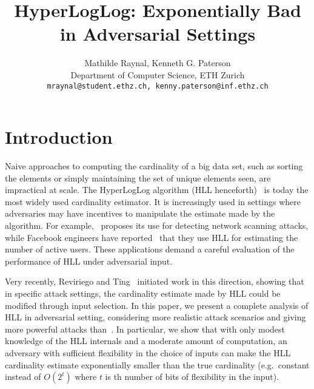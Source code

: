 \documentclass{IEEEtran}
\title{HyperLogLog: Exponentially Bad in Adversarial Settings}
\author{Mathilde Raynal, Kenneth G. Paterson\\
\vspace{3mm}
Department of Computer Science, ETH Zurich\\
{\tt mraynal@student.ethz.ch, kenny.paterson@inf.ethz.ch}}
\begin{document}
\maketitle


\IEEEdisplaynontitleabstractindextext

\section{Introduction}
Naive approaches to computing the cardinality of a big data set, such as sorting the elements or simply maintaining the set of unique elements seen, are impractical at scale. The HyperLogLog algorithm (HLL henceforth)~\cite{hll} is today the most widely used cardinality estimator. It is increasingly used in settings where adversaries may have  incentives to manipulate the estimate made by the algorithm. For example,~\cite{portscanhll} proposes its use for detecting network scanning attacks, while Facebook engineers have reported~\cite{fbhll} that they use HLL for estimating the number of active users. These applications demand a careful evaluation of the performance of HLL under adversarial input.

Very recently, Reviriego and Ting~\cite{hllvuln} initiated work in this direction, showing that in specific attack settings, the cardinality estimate made by HLL could be modified through input selection. In this paper, we present a complete analysis of HLL in adversarial setting, considering more realistic attack scenarios and giving more powerful attacks than~\cite{hllvuln}. In particular, we show that with only modest knowledge of the HLL internals and a moderate amount of computation, an adversary with sufficient flexibility in the choice of inputs can make the HLL cardinality estimate exponentially smaller than the true cardinality (e.g.\ constant instead of $O(2^t)$ where $t$ is th number of bits of flexibility in the input).
\end{document}
